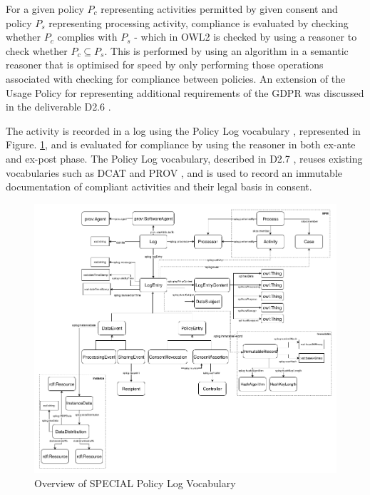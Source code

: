 For a given policy $P_c$ representing activities permitted by given consent and policy $P_s$ representing processing activity, compliance is evaluated by checking whether $P_c$ complies with $P_s$ - which in OWL2 is checked by using a reasoner to check whether $P_c \subseteq P_s$. This is performed by using an algorithm \cite{bonatti_fast_2018,bonatti_richer_2019} in a semantic reasoner that is optimised for speed by only performing those operations associated with checking for compliance between policies.
An extension of the Usage Policy for representing additional requirements of the GDPR was discussed in the deliverable D2.6 \cite{bonatti_d2.6_2018}.

The activity is recorded in a log using the Policy Log vocabulary \cite{bonatti_special_2018-1}, represented in Figure. \ref{fig:SPECIAL-policy-log-vocabulary}, and is evaluated for compliance by using the reasoner in both ex-ante and ex-post phase. The Policy Log vocabulary, described in D2.7 \cite{kirrane_d2.7_2018}, reuses existing vocabularies such as DCAT and PROV \cite{lebo_prov-o:_2013}, and is used to record an immutable documentation of compliant activities and their legal basis in consent.

\begin{figure}[htbp]
    \centering
    \includegraphics[width=\linewidth]{img/SPECIAL_logvocabulary.png}
    \caption{Overview of SPECIAL Policy Log Vocabulary \cite{bonatti_special_2018-1}}
    \label{fig:SPECIAL-policy-log-vocabulary}
\end{figure}

